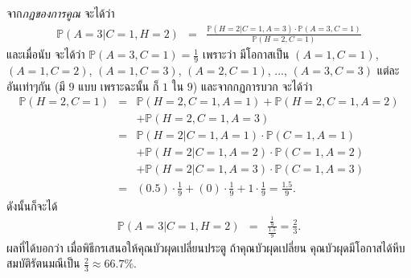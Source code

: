 จาก\textit{กฏของการคูณ} จะได้ว่า
\begin{eqnarray}
\mathbb{P}(A = 3|C = 1, H = 2)
&=&
  \frac{\mathbb{P}(H = 2|C = 1, A = 3) \cdot \mathbb{P}(A = 3, C = 1) }{ \mathbb{P}(H = 2, C = 1) }
\nonumber
\end{eqnarray}
และเมื่อนับ จะได้ว่า $\mathbb{P}(A = 3, C = 1) = \frac{1}{9}$ เพราะว่า มีโอกาสเป็น $(A = 1, C = 1)$, $(A = 1, C = 2)$, $(A = 1, C = 3)$, $(A = 2, C = 1)$, ..., $(A = 3, C = 3)$ แต่ละอันเท่าๆกัน (มี $9$ แบบ เพราะฉะนั้น ก็ $1$ ใน $9$)
และจากกฏการบวก จะได้ว่า
\begin{eqnarray}
\mathbb{P}(H = 2, C = 1) &=& \mathbb{P}(H = 2, C = 1, A = 1) + \mathbb{P}(H = 2, C = 1, A = 2) 
\nonumber \\
  &\;& + \mathbb{P}(H = 2, C = 1, A = 3)
\nonumber \\
&=& \mathbb{P}(H = 2| C = 1, A = 1) \cdot \mathbb{P}(C = 1, A = 1)
\nonumber \\
&\;& + \mathbb{P}(H = 2| C = 1, A = 2)  \cdot \mathbb{P}(C = 1, A = 2)
\nonumber \\
  &\;& + \mathbb{P}(H = 2| C = 1, A = 3) \cdot \mathbb{P}(C = 1, A = 3)
\nonumber \\
&=& (0.5) \cdot \frac{1}{9} + (0) \cdot \frac{1}{9} + 1 \cdot \frac{1}{9} = \frac{1.5}{9}
\nonumber .
\end{eqnarray}
ดังนั้นก็จะได้
\begin{eqnarray}
\mathbb{P}(A = 3|C = 1, H = 2) &=& \frac{ \frac{1}{9} }{ \frac{1.5}{9} } = \frac{2}{3}
\nonumber .
\end{eqnarray}
ผลที่ได้บอกว่า เมื่อพิธีกรเสนอให้คุณบัวผุดเปลี่ยนประตู ถ้าคุณบัวผุดเปลี่ยน คุณบัวผุดมีโอกาสได้หีบสมบัติรัตนมณีเป็น 
$\frac{2}{3} \approx 66.7\%$.

